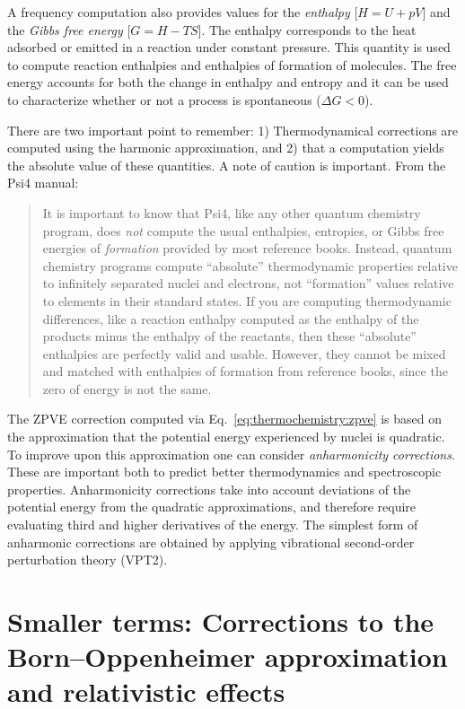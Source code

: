 \documentclass[../Main/notes.tex]{subfiles}
\begin{document}
A frequency computation also provides values for the \emph{enthalpy} [$H = U + pV$] and the \emph{Gibbs free energy} [$G = H - TS$].
The enthalpy corresponds to the heat adsorbed or emitted in a reaction under constant pressure.
This quantity is used to compute reaction enthalpies and enthalpies of formation of molecules.
The free energy accounts for both the change in enthalpy and entropy and it can be used to characterize whether or not a process is spontaneous ($\Delta G < 0$).

There are two important point to remember: 1) Thermodynamical corrections are computed using the harmonic approximation, and 2) that a computation yields the absolute value of these quantities.
A note of caution is important. From the Psi4 manual:
\begin{quote}
 It is important to know that Psi4, like any other quantum chemistry program, does \textit{not} compute the usual enthalpies, entropies, or Gibbs free energies of \textit{formation} provided by most reference books. Instead, quantum chemistry programs compute “absolute” thermodynamic properties relative to infinitely separated nuclei and electrons, not “formation” values relative to elements in their standard states. If you are computing thermodynamic differences, like a reaction enthalpy computed as the enthalpy of the products minus the enthalpy of the reactants, then these “absolute” enthalpies are perfectly valid and usable. However, they cannot be mixed and matched with enthalpies of formation from reference books, since the zero of energy is not the same.
\end{quote}


The ZPVE correction computed via Eq.~\eqref{eq:thermochemistry:zpve} is based on the approximation that the potential energy experienced by nuclei is quadratic.
To improve upon this approximation one can consider \emph{anharmonicity corrections}.
These are important both to predict better thermodynamics and spectroscopic properties.
Anharmonicity corrections take into account deviations of the potential energy from the quadratic approximations, and therefore require evaluating third and higher derivatives of the energy.
The simplest form of anharmonic corrections are obtained by applying vibrational  second-order perturbation theory (VPT2).

\section{Smaller terms: Corrections to the Born--Oppenheimer approximation and relativistic effects}
\end{document}
